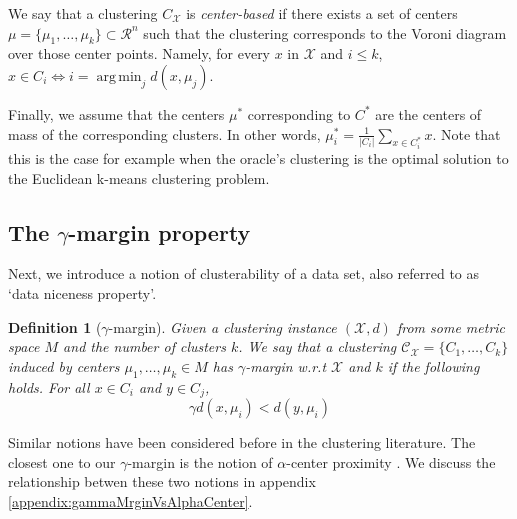 \documentclass{article}
\newcommand{\mc}{\mathcal}
\DeclareMathOperator*{\argmin}{arg\,min}
\newtheorem{definition}[theorem]{Definition}
\begin{document}
We say that a clustering $C_{\mc X}$ is \emph{center-based} if there exists a set of centers $\mc \mu = \{\mu_1, \ldots, \mu_k\} \subset \mc R^n$ such that the clustering corresponds to the Voroni diagram over those center points. Namely, for every $x$ in $\mc X$ and $i \leq k$,  $x\in C_i \Leftrightarrow i=\argmin_j d(x,\mu_j)$. 







Finally, we assume that the centers $\mu^*$ corresponding to $C^*$ are the centers of mass of the corresponding clusters. In other words, $\mu^*_i=\frac{1}{|C_i|}\sum_{x\in C^*_i} x$. Note that this is the case for example when the oracle's clustering is the optimal solution to the Euclidean k-means clustering problem.

\subsection{The $\gamma$-margin property}
Next, we introduce a notion of clusterability of a data set, also referred to as `data niceness property'.

\begin{definition}[$\gamma$-margin]
\label{defn:alphacp}
Given a clustering instance $(\mc X, d)$ from some metric space $M$ and the number of clusters $k$. We say that a clustering $\mc C_{\mc X} = \{C_1, \ldots, C_k\}$ induced by centers $\mu_1, \ldots, \mu_k \in M$ has $\gamma$-margin w.r.t $\mc X$ and $k$ if the following holds. For all $x \in C_i$ and $y \in C_j$, 
$$\gamma d(x, \mu_i) < d(y, \mu_i)$$
\end{definition}

Similar notions have been considered before in the clustering literature. The closest one to our $\gamma$-margin is the notion of $\alpha$-center proximity \cite{balcan2012clustering,awasthi2012center}. We discuss the relationship betwen these two notions in appendix \ref{appendix:gammaMrginVsAlphaCenter}. 
\end{document}
